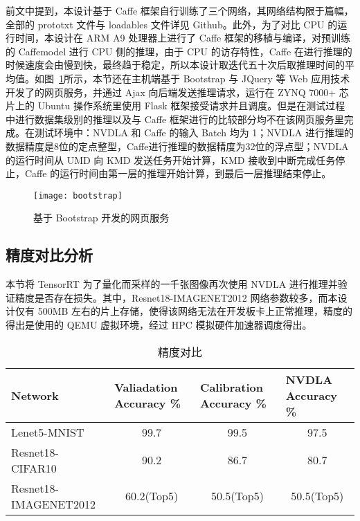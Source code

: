 前文中提到，本设计基于 Caffe 框架自行训练了三个网络，其网络结构限于篇幅，全部的 prototxt 文件与 loadables 文件详见 Github\cite{nvdla_loadables}。此外，为了对比 CPU 的运行时间，本设计在 ARM A9 处理器上进行了 Caffe 框架的移植与编译，对预训练的 Caffemodel 进行 CPU 侧的推理，由于 CPU 的访存特性，Caffe 在进行推理的时候速度会由慢到快，最终趋于稳定，所以本设计取迭代五十次后取推理时间的平均值。如图~\ref{fig:BootStrap}所示，本节还在主机端基于 Bootstrap 与 JQuery 等 Web 应用技术开发了的网页服务，并通过 Ajax 向后端发送推理请求，运行在 ZYNQ 7000+ 芯片上的 Ubuntu 操作系统里使用 Flask 框架接受请求并且调度。但是在测试过程中进行数据集级别的推理以及与 Caffe 框架进行的比较部分均不在该网页服务里完成。在测试环境中：NVDLA 和 Caffe 的输入 Batch 均为 1；NVDLA 进行推理的数据精度是8位的定点整型，Caffe进行推理的数据精度为32位的浮点型；NVDLA 的运行时间从 UMD 向 KMD 发送任务开始计算，KMD 接收到中断完成任务停止，Caffe 的运行时间由第一层的推理开始计算，到最后一层推理结束停止。

\begin{figure}[!htbp]
    \centering
    \texttt{[image: bootstrap]}
    \caption{基于 Bootstrap 开发的网页服务}
    \label{fig:BootStrap}
\end{figure}

\subsection{精度对比分析}

本节将 TensorRT 为了量化而采样的一千张图像再次使用 NVDLA 进行推理并验证精度是否存在损失。其中，Resnet18-IMAGENET2012 网络参数较多，而本设计仅有 500MB 左右的片上存储，使得该网络无法在开发板卡上正常推理，精度的得出是使用的 QEMU 虚拟环境，经过 HPC 模拟硬件加速器调度得出。

\begin{table}[!htbp]
    \caption{精度对比}
    \label{tab:Qualifications Report}
    \centering
    \footnotesize%
    \setlength{\tabcolsep}{4pt}%
    \renewcommand{\arraystretch}{1.2}%
    \begin{tabular}{lccc}
        \toprule
        \textbf{Network}      & \multicolumn{1}{l}{\textbf{Valiadation Accuracy \%}} & \multicolumn{1}{l}{\textbf{Calibration Accuracy \%}}  & \multicolumn{1}{l}{\textbf{NVDLA Accuracy \%}} \\
        \midrule
        Lenet5-MNIST          & 99.7                                                 & 99.5                                                 & 97.5                                                 \\  
        Resnet18-CIFAR10      & 90.2                                                 & 86.7                                                 & 80.7                                                 \\
        Resnet18-IMAGENET2012 & 60.2(Top5)                                           & 50.5(Top5)                                           & 50.5(Top5)                                           \\
        \bottomrule                   
    \end{tabular}
\end{table}

